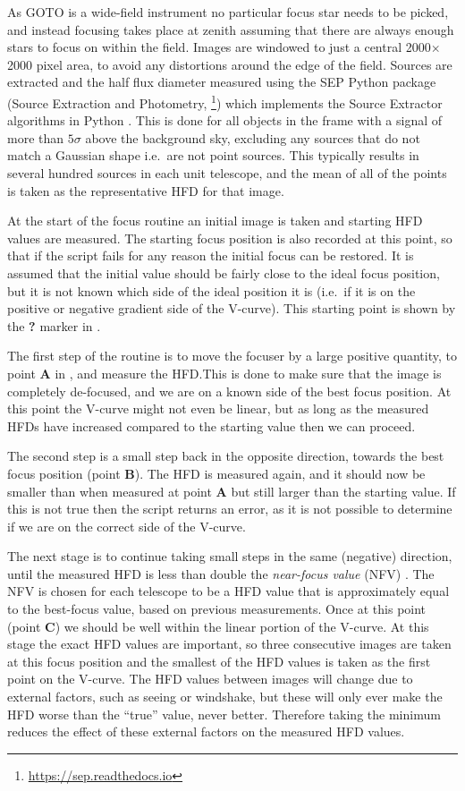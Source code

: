 \begin{colsection}
As GOTO is a wide-field instrument no particular focus star needs to be picked, and instead focusing takes place at zenith assuming that there are always enough stars to focus on within the field. Images are windowed to just a central 2000$\times$2000 pixel area, to avoid any distortions around the edge of the field. Sources are extracted and the half flux diameter measured using the SEP Python package (Source Extraction and Photometry, \footnote{\url{https://sep.readthedocs.io}}) which implements the Source Extractor algorithms in Python \citep{SE}. This is done for all objects in the frame with a signal of more than $5\sigma$ above the background sky, excluding any sources that do not match a Gaussian shape i.e.\ are not point sources. This typically results in several hundred sources in each unit telescope, and the mean of all of the points is taken as the representative HFD for that image.

At the start of the focus routine an initial image is taken and starting HFD values are measured. The starting focus position is also recorded at this point, so that if the script fails for any reason the initial focus can be restored. It is assumed that the initial value should be fairly close to the ideal focus position, but it is not known which side of the ideal position it is (i.e.\ if it is on the positive or negative gradient side of the V-curve). This starting point is shown by the \textbf{?} marker in .

The first step of the routine is to move the focuser by a large positive quantity, to point \textbf{A} in , and measure the HFD.\@ This is done to make sure that the image is completely de-focused, and we are on a known side of the best focus position. At this point the V-curve might not even be linear, but as long as the measured HFDs have increased compared to the starting value then we can proceed.

The second step is a small step back in the opposite direction, towards the best focus position (point \textbf{B}). The HFD is measured again, and it should now be smaller than when measured at point \textbf{A} but still larger than the starting value. If this is not true then the script returns an error, as it is not possible to determine if we are on the correct side of the V-curve.

The next stage is to continue taking small steps in the same (negative) direction, until the measured HFD is less than double the \emph{near-focus value} (NFV) . The NFV is chosen for each telescope to be a HFD value that is approximately equal to the best-focus value, based on previous measurements. Once at this point (point \textbf{C}) we should be well within the linear portion of the V-curve. At this stage the exact HFD values are important, so three consecutive images are taken at this focus position and the smallest of the HFD values is taken as the first point on the V-curve. The HFD values between images will change due to external factors, such as seeing or windshake, but these will only ever make the HFD worse than the ``true'' value, never better. Therefore taking the minimum reduces the effect of these external factors on the measured HFD values.


\end{colsection}
